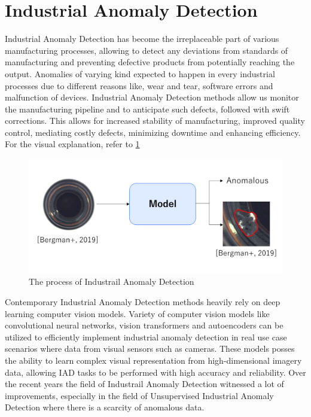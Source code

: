 \section{Industrial Anomaly Detection}
\label{iad}
Industrial Anomaly Detection has become the irreplaceable part of various manufacturing processes, allowing to detect any deviations from standards of manufacturing and preventing defective products from potentially reaching the output. Anomalies of varying kind expected to happen in every industrial processes due to different reasons like, wear and tear, software errors and malfunction of devices. Industrial Anomaly Detection methods allow us monitor the manufacturing pipeline and to anticipate such defects, followed with swift corrections. This allows for increased stability of manufacturing, improved quality control, mediating costly defects, minimizing downtime and enhancing efficiency. For the visual explanation, refer to \ref{fig:iad}

\begin{figure}[h]
	\begin{center}
		\includegraphics[width=0.8\linewidth]{Chapter_2/iad.png}
	\end{center}
	\caption{The process of Industrail Anomaly Detection}
	\label{fig:iad}
\end{figure}

Contemporary Industrial Anomaly Detection methods heavily rely on deep learning computer vision models. Variety of computer vision models like convolutional neural networks, vision transformers and autoencoders can be utilized to efficiently implement industrial anomaly detection in real use case scenarios where data from visual sensors such as cameras. These models posses the ability to learn complex visual representation from high-dimensional imagery data, allowing IAD tasks to be performed with high accuracy and reliability. Over the recent years the field of Industrail Anomaly Detection witnessed a lot of improvements, especially in the field of Unsupervised Industrial Anomaly Detection where there is a scarcity of anomalous data. 

